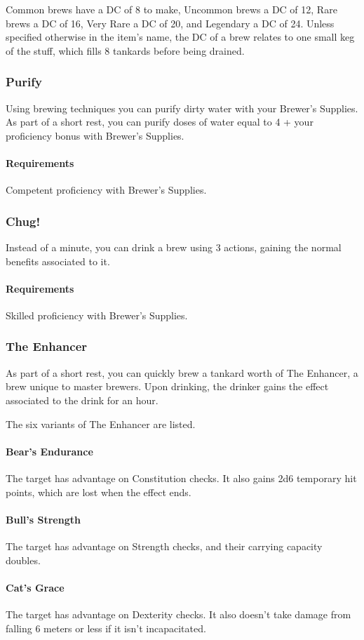     Common brews have a DC of 8 to make, Uncommon brews a DC of 12, Rare brews a DC of 16, Very Rare a DC of 20, and Legendary a DC of 24.
    Unless specified otherwise in the item's name, the DC of a brew relates to one small keg of the stuff, which fills 8 tankards before being drained.
\subsubsection{Purify} \label{feat::purify}
    Using brewing techniques you can purify dirty water with your Brewer's Supplies.
    As part of a short rest, you can purify doses of water equal to 4 + your proficiency bonus with Brewer's Supplies.
    \paragraph{Requirements} Competent proficiency with Brewer's Supplies.
\subsubsection{Chug!} \label{feat::chug}
    Instead of a minute, you can drink a brew using 3 actions, gaining the normal benefits associated to it.
    \paragraph{Requirements} Skilled proficiency with Brewer's Supplies.
\subsubsection{The Enhancer} \label{feat::theenhancer}
    As part of a short rest, you can quickly brew a tankard worth of The Enhancer, a brew unique to master brewers.
    Upon drinking, the drinker gains the effect associated to the drink for an hour.

    The six variants of The Enhancer are listed.
    \paragraph{Bear's Endurance} The target has advantage on Constitution checks.
    It also gains 2d6 temporary hit points, which are lost when the effect ends.
    \paragraph{Bull's Strength} The target has advantage on Strength checks, and their carrying capacity doubles.
    \paragraph{Cat's Grace} The target has advantage on Dexterity checks.
    It also doesn't take damage from falling 6 meters or less if it isn't incapacitated.
